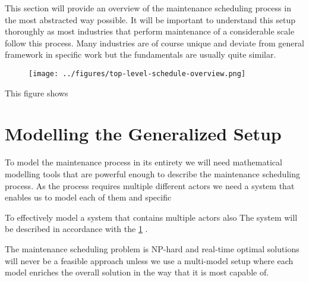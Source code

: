 This section will provide an overview of the maintenance scheduling process in the most abstracted way possible. It will be important to understand this setup
thoroughly as most industries that perform maintenance of a considerable scale follow this process. Many industries are of course unique and deviate
from general framework in specific work but the fundamentals are usually quite similar. 

\begin{figure}
\texttt{[image: ../figures/top-level-schedule-overview.png]}
\label{top-level-schedule-overview.png}
\end{figure}


This figure shows 



\chapter{Modelling the Generalized Setup}
To model the maintenance process in its entirety we will need mathematical modelling tools that are powerful enough to describe the maintenance
scheduling process. As the process requires multiple different actors we need a system that enables us to model each of them and specific   

To effectively model a system that contains multiple actors also 
The system will be described in accordance 
with the \ref{top-level-schedule-overview.png} \cite{palmer_maintenance_2019}.

The maintenance scheduling problem is NP-hard and real-time optimal solutions will never be a feasible approach unless we use a multi-model setup where each model enriches the 
overall solution in the way that it is most capable of. 

